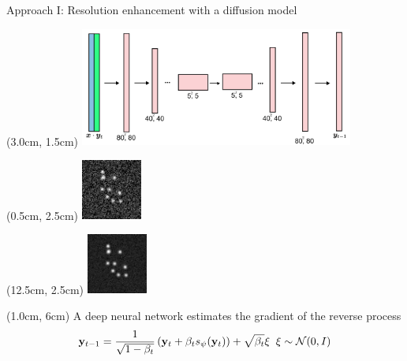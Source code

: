 \documentclass{beamer}					%
\begin{document}
\begin{frame}{Approach I: Resolution enhancement with a diffusion model}
\begin{textblock*}{9cm}(3.0cm, 1.5cm)
\includegraphics[width=9cm]{../../ddpm/ddpm/media/DiffusionArch.png}
\end{textblock*}
\begin{textblock*}{2cm}(0.5cm, 2.5cm)
\includegraphics[width=2cm]{../../dissertation/dissertation/media/diffusion_example/0_1_sr_79.png}
\end{textblock*}
\begin{textblock*}{2cm}(12.5cm, 2.5cm)
\includegraphics[width=2cm]{../../dissertation/dissertation/media/diffusion_example/0_1_sr_99.png}
\end{textblock*}

\begin{textblock*}{13cm}(1.0cm, 6cm)
A deep neural network estimates the gradient of the reverse process
\begin{equation*}
\bold{y}_{t-1} = \frac{1}{\sqrt{1-\beta_{t}}}\left(\bold{y}_{t} + \beta_{t}s_{\psi}(\bold{y}_{t})\right) + \sqrt{\beta_{t}}\xi \;\; \xi \sim \mathcal{N}(0,I)
\end{equation*}
\end{textblock*}
\end{frame}
\end{document}
